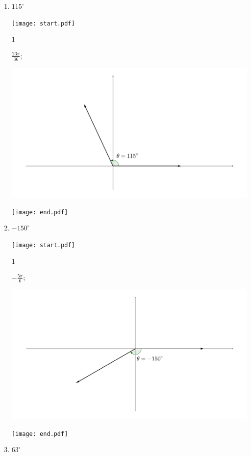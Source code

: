 \documentclass[12pt]{article}
\begin{document}
\begin{enumerate}
\begin{enumerate}

\item $\displaystyle 115^{\circ}$

\texttt{[image: start.pdf]}
{{1\linewidth}{$\displaystyle \frac{23\pi}{36}$; \\
\begin{center}\includegraphics[scale=0.4]{115.pdf}
\end{center}}}
\texttt{[image: end.pdf]}


\newpage

\item $\displaystyle -150^{\circ}$

\texttt{[image: start.pdf]}
{{1\linewidth}{$\displaystyle -\frac{5\pi}{6}$;
\begin{center}\includegraphics[scale=0.4]{-150.pdf}
\end{center}}}
\texttt{[image: end.pdf]}


\item $\displaystyle 63^{\circ}$


\end{enumerate}
\end{enumerate}
\end{document}
